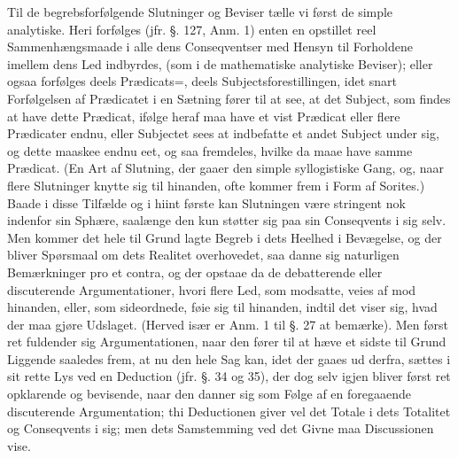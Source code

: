 \documentclass[12pt]{book}
\def\textit#1{#1}%
\newcommand{\opage}[1]{\marginnote{\footnotesize\textit{[#1]}}}
\begin{document}
Til de begrebsforfølgende Slutninger og Beviser tælle vi først de simple
analytiske. Heri forfølges (jfr. §. 127, Anm. 1) enten en
\opage{359} opstillet reel Sammenhængsmaade i alle dens Conseqventser med Hensyn til
Forholdene imellem dens Led indbyrdes, (som i de mathematiske analytiske
Beviser); eller ogsaa forfølges deels Prædicats=, deels Subjectsforestillingen,
idet snart Forfølgelsen af Prædicatet i en Sætning fører til at see, at det
Subject, som findes at have dette Prædicat, ifølge heraf maa have et vist
Prædicat eller flere Prædicater endnu, eller Subjectet sees at indbefatte et
andet Subject under sig, og dette maaskee endnu eet, og saa fremdeles, hvilke da
maae have samme Prædicat. (En Art af Slutning, der gaaer den simple
syllogistiske Gang, og, naar flere Slutninger knytte sig til hinanden, ofte
kommer frem i Form af \textit{Sorites}.) Baade i disse Tilfælde og i hiint
første kan Slutningen være stringent nok indenfor sin Sphære, saalænge den kun
støtter sig paa sin Conseqvents i sig selv. Men kommer det hele til Grund lagte
Begreb i dets Heelhed i Bevægelse, og der bliver Spørsmaal om dets Realitet
overhovedet, saa danne sig naturligen Bemærkninger \textit{pro et contra}, og
der opstaae da de debatterende eller discuterende Argumentationer, hvori flere
Led, som modsatte, veies af mod hinanden, eller, som sideordnede, føie sig til
hinanden, indtil det viser sig, hvad der maa gjøre Udslaget. (Herved især er
Anm. 1 til §. 27 at bemærke). Men først ret fuldender sig Argumentationen, naar
den fører til at hæve et sidste til Grund Liggende saaledes frem, at nu den
\opage{360} hele Sag kan, idet der gaaes ud derfra, sættes i sit rette Lys ved en Deduction
(jfr. §. 34 og 35), der dog selv igjen bliver først ret opklarende og bevisende,
naar den danner sig som Følge af en foregaaende discuterende Argumentation; thi
Deductionen giver vel det Totale i dets Totalitet og Conseqvents i sig; men dets
Samstemming ved det Givne maa Discussionen vise.
\end{document}

